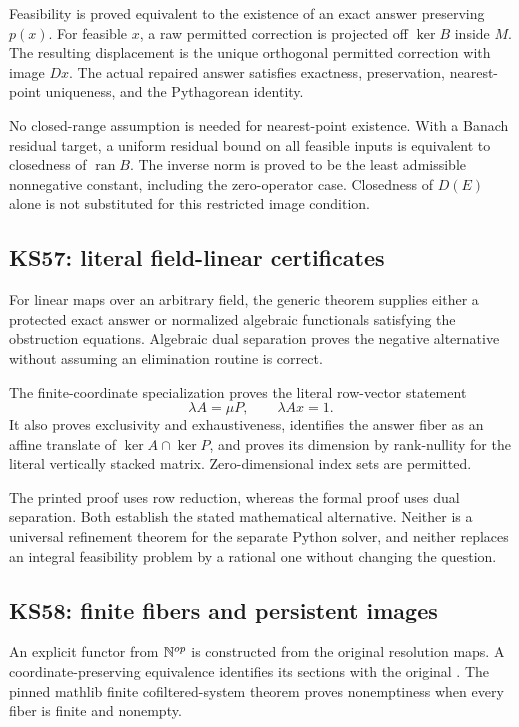 \documentclass[11pt]{article}
\begin{document}
Feasibility is proved equivalent to the existence of an exact answer preserving \(p(x)\). For feasible \(x\), a raw permitted correction is projected off \(\ker B\) inside \(M\). The resulting displacement is the unique orthogonal permitted correction with image \(Dx\). The actual repaired answer satisfies exactness, preservation, nearest-point uniqueness, and the Pythagorean identity.

No closed-range assumption is needed for nearest-point existence. With a Banach residual target, a uniform residual bound on all feasible inputs is equivalent to closedness of \(\operatorname{ran}B\). The inverse norm is proved to be the least admissible nonnegative constant, including the zero-operator case. Closedness of \(D(E)\) alone is not substituted for this restricted image condition.

\subsection{KS57: literal field-linear certificates}
For linear maps over an arbitrary field, the generic theorem supplies either a protected exact answer or normalized algebraic functionals satisfying the obstruction equations. Algebraic dual separation proves the negative alternative without assuming an elimination routine is correct.

The finite-coordinate specialization proves the literal row-vector statement
\[
 \lambda A=\mu P,\qquad \lambda Ax=1.
\]
It also proves exclusivity and exhaustiveness, identifies the answer fiber as an affine translate of \(\ker A\cap\ker P\), and proves its dimension by rank-nullity for the literal vertically stacked matrix. Zero-dimensional index sets are permitted.

The printed proof uses row reduction, whereas the formal proof uses dual separation. Both establish the stated mathematical alternative. Neither is a universal refinement theorem for the separate Python solver, and neither replaces an integral feasibility problem by a rational one without changing the question.

\subsection{KS58: finite fibers and persistent images}
An explicit functor from \(\mathbb N^{op}\) is constructed from the original resolution maps. A coordinate-preserving equivalence identifies its sections with the original . The pinned mathlib finite cofiltered-system theorem proves nonemptiness when every fiber is finite and nonempty.
\end{document}
